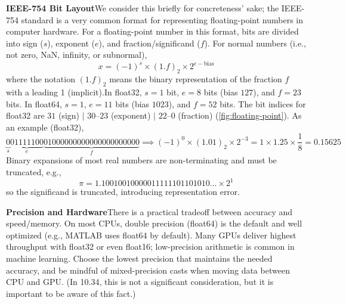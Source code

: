 \textbf{IEEE-754 Bit Layout}\quad We consider this briefly for concreteness' sake; the IEEE-754 standard is a very common format for representing floating-point numbers in computer hardware. For a floating-point number in this format, bits are divided into sign ($s$), exponent ($e$), and fraction/significand ($f$). For normal numbers (i.e., not zero, NaN, infinity, or subnormal),
\begin{equation*}
x = (-1)^s \times (1.f)_2 \times 2^{e-\text{bias}}
\end{equation*}
where the notation $(1.f)_2$ means the binary representation of the fraction $f$ with a leading 1 (implicit).In float32, $s=1$ bit, $e=8$ bits (bias $127$), and $f=23$ bits. In float64, $s=1$, $e=11$ bits (bias $1023$), and $f=52$ bits. The bit indices for float32 are $31$ (sign) $\mid$ $30\text{--}23$ (exponent) $\mid$ $22\text{--}0$ (fraction) (\autoref{fig:floating-point}). As an example (float32),
\begin{equation*}
\underbrace{0}_{s} \underbrace{01111100}_{e} \underbrace{01000000000000000000000}_{f}
\implies 
(-1)^0 \times (1.01)_2 \times 2^{-3} = 1 \times 1.25 \times \frac{1}{8}= 0.15625
\end{equation*}
Binary expansions of most real numbers are non-terminating and must be truncated, e.g.,
\[ \pi = 1.10010010000011111101101010\ldots \times 2^{1} \]
so the significand is truncated, introducing representation error.

\textbf{Precision and Hardware}\quad There is a practical tradeoff between accuracy and speed/memory. On most CPUs, double precision (float64) is the default and well optimized (e.g., MATLAB uses float64 by default). Many GPUs deliver highest throughput with float32 or even float16; low-precision arithmetic is common in machine learning. Choose the lowest precision that maintains the needed accuracy, and be mindful of mixed-precision casts when moving data between CPU and GPU. (In 10.34, this is not a significant consideration, but it is important to be aware of this fact.)


